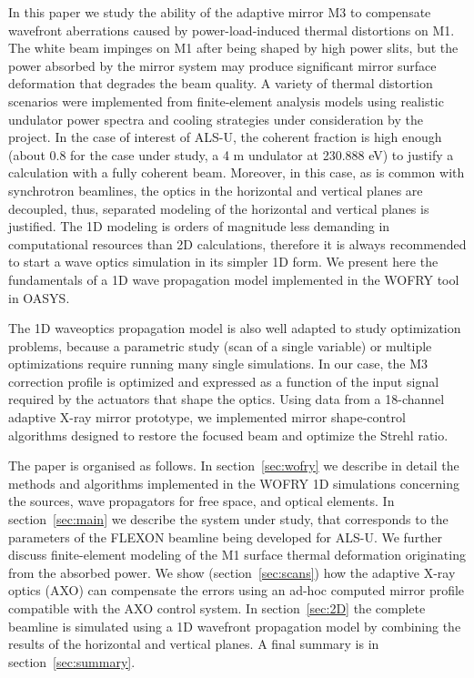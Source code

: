 \documentclass{iucr}
\begin{document}
In this paper we study the ability of the adaptive mirror M3 to compensate wavefront aberrations caused by power-load-induced thermal distortions on M1. The white beam impinges on M1 after being shaped by high power slits, but the power absorbed by the mirror system may produce significant mirror surface deformation that degrades the beam quality. 
A variety of thermal distortion scenarios were implemented from finite-element analysis models using realistic undulator power spectra and cooling strategies under consideration by the project.
In the case of interest of ALS-U, the coherent fraction is high enough (about 0.8 for the case under study, a 4 m undulator at 230.888 eV) to justify a calculation with a fully coherent beam. Moreover, in this case, as is common with synchrotron beamlines, the optics in the horizontal and vertical planes are decoupled, thus, separated modeling of the horizontal and vertical planes is justified. The 1D modeling is orders of magnitude less demanding in computational resources than 2D calculations, therefore it is always recommended to start a wave optics simulation in its simpler 1D form. We present here the fundamentals of a 1D wave propagation model implemented in the WOFRY \cite{codeWOFRY} tool in OASYS.

The 1D waveoptics propagation model is also well adapted to study optimization problems, because a parametric study (scan of a single variable) or multiple optimizations require running many single simulations. In our case, the M3 correction profile is optimized and expressed as a function of the input signal required by the actuators that shape the optics. 
Using data from a 18-channel adaptive X-ray mirror prototype, we implemented mirror shape-control algorithms designed to restore the focused beam and optimize the Strehl ratio.

The paper is organised as follows. In section~\ref{sec:wofry} we describe in detail the methods and algorithms implemented in the WOFRY 1D simulations concerning the sources, wave propagators for free space, and optical elements. In section~\ref{sec:main} we describe the system under study, that corresponds to the parameters of the FLEXON beamline being developed for ALS-U. We further discuss finite-element modeling of the M1 surface thermal deformation originating from the absorbed power. We show (section~\ref{sec:scans}) how the adaptive X-ray optics (AXO) can compensate the errors using an ad-hoc computed mirror profile compatible with the AXO control system. In section~\ref{sec:2D} the complete beamline is simulated using a 1D wavefront propagation model by combining the results of the horizontal and vertical planes. A final summary is in section~\ref{sec:summary}.
\end{document}
